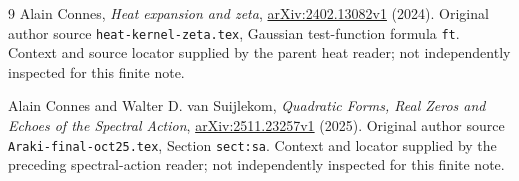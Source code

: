 \documentclass[11pt]{article}
\begin{document}
\begin{thebibliography}{9}
Alain Connes, \emph{Heat expansion and zeta},
\href{https://arxiv.org/abs/2402.13082v1}{arXiv:2402.13082v1} (2024).
Original author source \texttt{heat-kernel-zeta.tex}, Gaussian test-function
formula \texttt{ft}. Context and source locator supplied by the parent
heat reader; not independently inspected for this finite note.

Alain Connes and Walter D. van Suijlekom,
\emph{Quadratic Forms, Real Zeros and Echoes of the Spectral Action},
\href{https://arxiv.org/abs/2511.23257v1}{arXiv:2511.23257v1} (2025).
Original author source \texttt{Araki-final-oct25.tex},
Section \texttt{sect:sa}. Context and locator supplied by the preceding
spectral-action reader; not independently inspected for this finite note.
\end{thebibliography}
\end{document}
